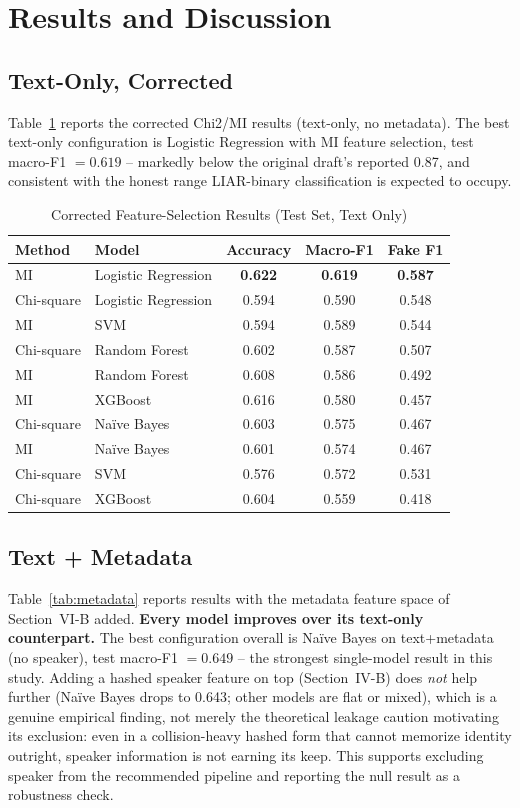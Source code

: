 \documentclass[conference]{IEEEtran}
\begin{document}
\section{Results and Discussion}

\subsection{Text-Only, Corrected}
Table~\ref{tab:proposed-text} reports the corrected Chi2/MI results (text-only,
no metadata). The best text-only configuration is Logistic Regression with MI
feature selection, test macro-F1 $=0.619$ -- markedly below the original draft's
reported 0.87, and consistent with the honest range LIAR-binary classification is
expected to occupy.

\begin{table}[!t]
\caption{Corrected Feature-Selection Results (Test Set, Text Only)}
\label{tab:proposed-text}
\centering
\begin{tabular}{llccc}
\toprule
Method & Model & Accuracy & Macro-F1 & Fake F1 \\
\midrule
MI & Logistic Regression & \textbf{0.622} & \textbf{0.619} & \textbf{0.587} \\
Chi-square & Logistic Regression & 0.594 & 0.590 & 0.548 \\
MI & SVM & 0.594 & 0.589 & 0.544 \\
Chi-square & Random Forest & 0.602 & 0.587 & 0.507 \\
MI & Random Forest & 0.608 & 0.586 & 0.492 \\
MI & XGBoost & 0.616 & 0.580 & 0.457 \\
Chi-square & Na\"ive Bayes & 0.603 & 0.575 & 0.467 \\
MI & Na\"ive Bayes & 0.601 & 0.574 & 0.467 \\
Chi-square & SVM & 0.576 & 0.572 & 0.531 \\
Chi-square & XGBoost & 0.604 & 0.559 & 0.418 \\
\bottomrule
\end{tabular}
\end{table}

\subsection{Text + Metadata}
Table~\ref{tab:metadata} reports results with the metadata feature space of
Section~VI-B added. \textbf{Every model improves over its text-only counterpart.}
The best configuration overall is Na\"ive Bayes on text+metadata (no speaker),
test macro-F1 $=0.649$ -- the strongest single-model result in this study. Adding
a hashed speaker feature on top (Section~IV-B) does \emph{not} help further
(Na\"ive Bayes drops to 0.643; other models are flat or mixed), which is a genuine
empirical finding, not merely the theoretical leakage caution motivating its
exclusion: even in a collision-heavy hashed form that cannot memorize identity
outright, speaker information is not earning its keep. This supports excluding
speaker from the recommended pipeline and reporting the null result as a
robustness check.
\end{document}
